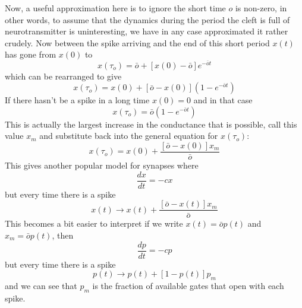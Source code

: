 \documentclass[11pt,a4paper]{scrartcl}
\begin{document}
Now, a useful approximation here is to ignore the short time $o$ is
non-zero, in other words, to assume that the dynamics during the
period the cleft is full of neurotransmitter is uninteresting, we have
in any case approximated it rather crudely. Now between the spike
arriving and the end of this short period $x(t)$ has gone from $x(0)$ to
\begin{equation}
x(\tau_o)=\bar{o}+[x(0)-\bar{o}]e^{-\bar{o}t}
\end{equation}
which can be rearranged to give
\begin{equation}
x(\tau_o)=x(0)+[\bar{o}-x(0)]\left(1-e^{-\bar{o}t}\right)
\end{equation}
If there hasn't be a spike in a long time $x(0)=0$ and in that case
\begin{equation}
x(\tau_o)=\bar{o}\left(1-e^{-\bar{o}t}\right)
\end{equation}
This is actually the largest increase in the conductance that is
possible, call this value $x_m$ and substitute back into the general
equation for $x(\tau_o)$:
\begin{equation}
x(\tau_o)=x(0)+\frac{[\bar{o}-x(0)]x_m}{\bar{o}}
\end{equation}
This gives another popular model for synapses where 
\begin{equation}
\frac{dx}{dt}=-cx
\end{equation}
but every time there is a spike
\begin{equation}
x(t)\rightarrow x(t)+\frac{[\bar{o}-x(t)]x_m}{\bar{o}}
\end{equation}
This becomes a bit easier to interpret if we write $x(t)=\bar{o}p(t)$ and $x_m=\bar{o}p(t)$, then
\begin{equation}
\frac{dp}{dt}=-cp
\end{equation}
but every time there is a spike
\begin{equation}
p(t)\rightarrow p(t)+[1-p(t)]p_m
\end{equation}
and we can see that $p_m$ is the fraction of available gates that open
with each spike.
\end{document}
